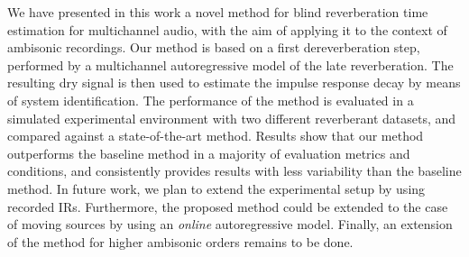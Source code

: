 We have presented in this work a novel method for blind reverberation time estimation for multichannel audio, with the aim of applying it to the context of ambisonic recordings. Our method is based on a first dereverberation step,  performed by a multichannel autoregressive model of the late reverberation. The resulting dry signal is then used to estimate the impulse response decay by means of system identification. 
The performance of the method is evaluated in a simulated experimental environment with two different reverberant datasets, and compared against a state-of-the-art method. 
Results show that our method outperforms the baseline method in a majority of evaluation metrics and conditions, and consistently provides results with less variability than the baseline method. 
In future work, we plan to extend the experimental setup by using recorded IRs. Furthermore, the proposed method could be extended to the case of moving sources by using an \textit{online} autoregressive model. 
Finally, an extension of the method for higher ambisonic orders remains to be done.
